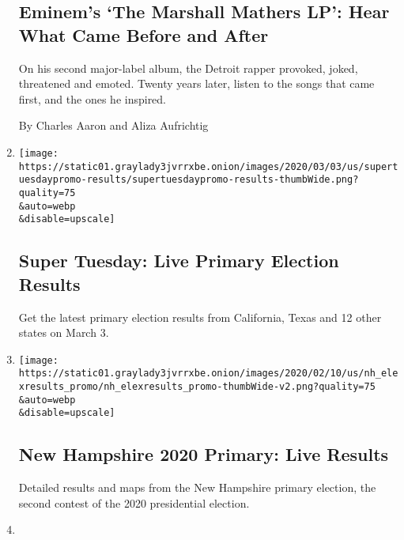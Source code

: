 \begin{enumerate}
  \hypertarget{eminems-the-marshall-mathers-lp-hear-what-came-before-and-after}{%
  \subsection{Eminem's `The Marshall Mathers LP': Hear What Came Before
  and
  After}\label{eminems-the-marshall-mathers-lp-hear-what-came-before-and-after}}

  On his second major-label album, the Detroit rapper provoked, joked,
  threatened and emoted. Twenty years later, listen to the songs that
  came first, and the ones he inspired.

  By Charles Aaron and Aliza Aufrichtig
\item
  \href{/interactive/2020/03/03/us/elections/results-super-tuesday-primary-election.html}{}

  \texttt{[image: https://static01.graylady3jvrrxbe.onion/images/2020/03/03/us/supertuesdaypromo-results/supertuesdaypromo-results-thumbWide.png?quality=75\\\&auto=webp\\\&disable=upscale]}

  \hypertarget{super-tuesday-live-primary-election-results}{%
  \subsection{Super Tuesday: Live Primary Election
  Results}\label{super-tuesday-live-primary-election-results}}

  Get the latest primary election results from California, Texas and 12
  other states on March 3.
\item
  \href{/interactive/2020/02/11/us/elections/results-new-hampshire-primary-election.html}{}

  \texttt{[image: https://static01.graylady3jvrrxbe.onion/images/2020/02/10/us/nh\_elexresults\_promo/nh\_elexresults\_promo-thumbWide-v2.png?quality=75\\\&auto=webp\\\&disable=upscale]}

  \hypertarget{new-hampshire-2020-primary-live-results}{%
  \subsection{New Hampshire 2020 Primary: Live
  Results}\label{new-hampshire-2020-primary-live-results}}

  Detailed results and maps from the New Hampshire primary election, the
  second contest of the 2020 presidential election.
\item
  \href{/interactive/2020/02/04/us/elections/results-iowa-caucus.html}{}


\end{enumerate}
